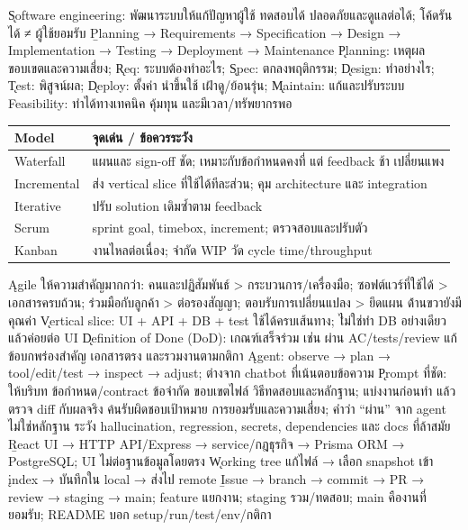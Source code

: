 \k{Software engineering}: พัฒนาระบบให้แก้ปัญหาผู้ใช้ ทดสอบได้ ปลอดภัยและดูแลต่อได้; โค้ดรันได้ ≠ ผู้ใช้ยอมรับ
\b{Planning → Requirements → Specification → Design → Implementation → Testing → Deployment → Maintenance}
\k{Planning}: เหตุผล ขอบเขตและความเสี่ยง; \k{Req}: ระบบต้องทำอะไร; \k{Spec}: ตกลงพฤติกรรม; \k{Design}: ทำอย่างไร; \k{Test}: พิสูจน์ผล; \k{Deploy}: ตั้งค่า นำขึ้นใช้ เฝ้าดู/ย้อนรุ่น; \k{Maintain}: แก้และปรับระบบ
\extra Feasibility: ทำได้ทางเทคนิค คุ้มทุน และมีเวลา/ทรัพยากรพอ
{\smalltable\begin{tabularx}{\linewidth}{|p{10mm}|Y|}\hline
{}Model & จุดเด่น / ข้อควรระวัง\\\hline
Waterfall & แผนและ sign-off ชัด; เหมาะกับข้อกำหนดคงที่ แต่ feedback ช้า เปลี่ยนแพง\\\hline
Incremental & ส่ง vertical slice ที่ใช้ได้ทีละส่วน; คุม architecture และ integration\\\hline
Iterative & ปรับ solution เดิมซ้ำตาม feedback\\\hline
Scrum & sprint goal, timebox, increment; ตรวจสอบและปรับตัว\\\hline
Kanban & งานไหลต่อเนื่อง; จำกัด WIP วัด cycle time/throughput\\\hline
\end{tabularx}}
\k{Agile ให้ความสำคัญมากกว่า}: คนและปฏิสัมพันธ์ > กระบวนการ/เครื่องมือ; ซอฟต์แวร์ที่ใช้ได้ > เอกสารครบถ้วน; ร่วมมือกับลูกค้า > ต่อรองสัญญา; ตอบรับการเปลี่ยนแปลง > ยึดแผน \r{ด้านขวายังมีคุณค่า}
\k{Vertical slice}: UI + API + DB + test ใช้ได้ครบเส้นทาง; \r{ไม่ใช่ทำ DB อย่างเดียวแล้วค่อยต่อ UI}
\k{Definition of Done (DoD)}: เกณฑ์เสร็จร่วม เช่น ผ่าน AC/tests/review แก้ข้อบกพร่องสำคัญ เอกสารตรง และรวมงานตามกติกา
\k{Agent}: observe → plan → tool/edit/test → inspect → adjust; ต่างจาก chatbot ที่เน้นตอบข้อความ
\k{Prompt ที่ชัด}: ให้บริบท ข้อกำหนด/contract ข้อจำกัด ขอบเขตไฟล์ วิธีทดสอบและหลักฐาน; แบ่งงานก่อนทำ แล้วตรวจ diff กับผลจริง
\r{คนรับผิดชอบเป้าหมาย การยอมรับและความเสี่ยง}; คำว่า “ผ่าน” จาก agent ไม่ใช่หลักฐาน ระวัง hallucination, regression, secrets, dependencies และ docs ที่ล้าสมัย
\b{React UI → HTTP API/Express → service/กฎธุรกิจ → Prisma ORM → PostgreSQL}; UI ไม่ต่อฐานข้อมูลโดยตรง
\k{Working tree} แก้ไฟล์ →  เลือก snapshot เข้า \k{index} →  บันทึกใน local →  ส่งไป remote
\b{Issue → branch → commit → PR → review → staging → main}; feature แยกงาน; staging รวม/ทดสอบ; main คืองานที่ยอมรับ; README บอก setup/run/test/env/กติกา
